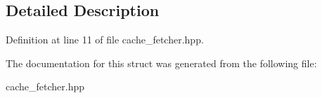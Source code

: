 \subsection{Detailed Description}


Definition at line 11 of file cache\-\_\-fetcher.\-hpp.



The documentation for this struct was generated from the following file\-:\begin{DoxyCompactItemize}
\item 
cache\-\_\-fetcher.\-hpp\end{DoxyCompactItemize}
